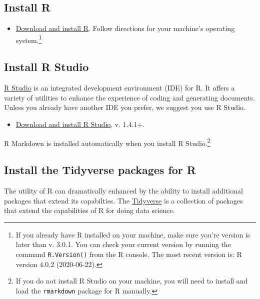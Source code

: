 \documentclass[
]{book}
\providecommand{\tightlist}{%
  \setlength{\itemsep}{0pt}\setlength{\parskip}{0pt}}
\begin{document}
\hypertarget{install-r}{%
\subsection{Install R}\label{install-r}}

\begin{itemize}
\tightlist
\item
  \href{https://cran.rstudio.com/}{Download and install R}. Follow directions for your machine's operating system.\footnote{If you already have R installed on your machine, make sure you're version is later than v. 3.0.1. You can check your current version by running the command \texttt{R.Version()} from the R console. The most recent version is: R version 4.0.2 (2020-06-22).}
\end{itemize}

\hypertarget{install-r-studio}{%
\subsection{Install R Studio}\label{install-r-studio}}

\href{https://rstudio.com/products/rstudio/}{R Studio} is an integrated development environment (IDE) for R. It offers a variety of utilities to enhance the experience of coding and generating documents. Unless you already have another IDE you prefer, we suggest you use R Studio.

\begin{itemize}
\tightlist
\item
  \href{https://rstudio.com/products/rstudio/download/\#download}{Download and install R Studio}, v. 1.4.1+.
\end{itemize}

R Markdown is installed automatically when you install R Studio.\footnote{If you do not install R Studio on your machine, you will need to install and load the \texttt{rmarkdown} package for R manually.}

\hypertarget{install-the-tidyverse-packages-for-r}{%
\subsection{Install the Tidyverse packages for R}\label{install-the-tidyverse-packages-for-r}}

The utility of R can dramatically enhanced by the ability to install additional packages that extend its capabilties. The \href{https://www.tidyverse.org/}{Tidyverse} is a collection of packages that extend the capabilities of R for doing data science.
\end{document}

